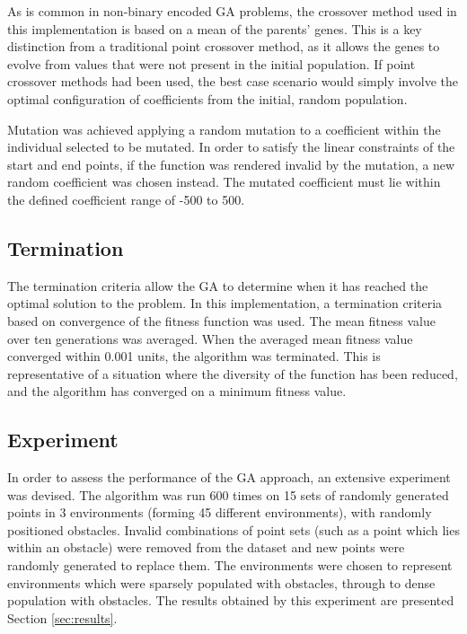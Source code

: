As is common in non-binary encoded GA problems, the crossover method used in this implementation is based on a mean of the parents' genes. This is a key distinction from a traditional point crossover method, as it allows the genes to evolve from values that were not present in the initial population. If point crossover methods had been used, the best case scenario would simply involve the optimal configuration of coefficients from the initial, random population.

Mutation was achieved applying a random mutation to a coefficient within the individual selected to be mutated. In order to satisfy the linear constraints of the start and end points, if the function was rendered invalid by the mutation, a new random coefficient was chosen instead. The mutated coefficient must lie within the defined coefficient range of -500 to 500.

\subsection{Termination}
The termination criteria allow the GA to determine when it has reached the optimal solution to the problem. In this implementation, a termination criteria based on convergence of the fitness function was used. The mean fitness value over ten generations was averaged. When the averaged mean fitness value converged within 0.001 units, the algorithm was terminated. This is representative of a situation where the diversity of the function has been reduced, and the algorithm has converged on a minimum fitness value.

\subsection{Experiment} \label{sec:experiment}
In order to assess the performance of the GA approach, an extensive experiment was devised. The algorithm was run 600 times on 15 sets of randomly generated points in 3 environments (forming 45 different environments), with randomly positioned obstacles. Invalid combinations of point sets (such as a point which lies within an obstacle) were removed from the dataset and new points were randomly generated to replace them. The environments were chosen to represent environments which were sparsely populated with obstacles, through to dense population with obstacles. The results obtained by this experiment are presented Section \ref{sec:results}.
